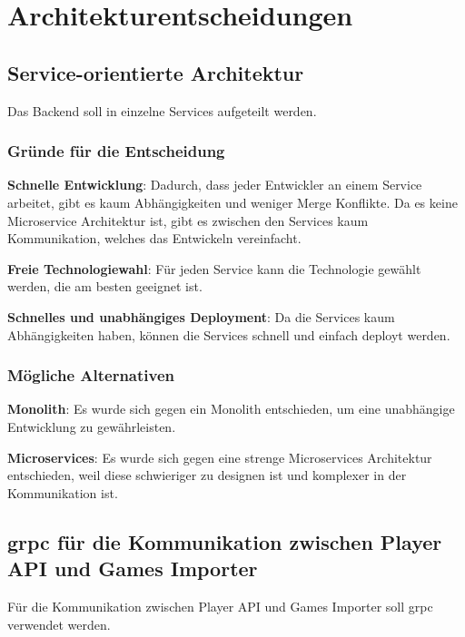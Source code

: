 \section{Architekturentscheidungen}

\subsection{Service-orientierte Architektur}\label{subsec:soa}

Das Backend soll in einzelne Services aufgeteilt werden.

\subsubsection{Gründe für die Entscheidung}\label{subsubsec:grunde-fur-die-entscheidung}

\textbf{Schnelle Entwicklung}: Dadurch, dass jeder Entwickler an einem Service arbeitet, gibt es kaum Abhängigkeiten
und weniger Merge Konflikte.
Da es keine Microservice Architektur ist, gibt es zwischen den Services kaum Kommunikation, welches das Entwickeln vereinfacht.

\textbf{Freie Technologiewahl}: Für jeden Service kann die Technologie gewählt werden, die am besten geeignet ist.

\textbf{Schnelles und unabhängiges Deployment}: Da die Services kaum Abhängigkeiten haben, können die Services
schnell und einfach deployt werden.

\subsubsection{Mögliche Alternativen}\label{subsubsec:mogliche-alternativen}

\textbf{Monolith}: Es wurde sich gegen ein Monolith entschieden, um eine unabhängige Entwicklung zu gewährleisten.

\textbf{Microservices}: Es wurde sich gegen eine strenge Microservices Architektur entschieden, weil diese schwieriger
zu designen ist und komplexer in der Kommunikation ist.


\subsection{grpc für die Kommunikation zwischen Player API und Games Importer}\label{subsec:grpc-fur-die-kommunikation-zwischen-player-api-und-games-importer}

Für die Kommunikation zwischen Player API und Games Importer soll grpc verwendet werden.

